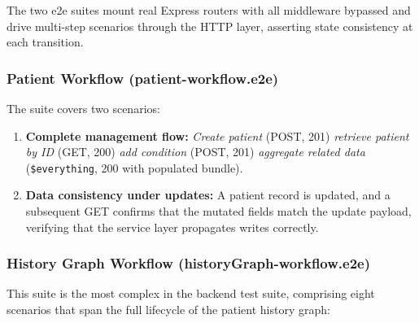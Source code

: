 The two e2e suites mount real Express routers with all middleware bypassed and
drive multi-step scenarios through the HTTP layer, asserting state consistency
at each transition.

\subsubsection{Patient Workflow (patient-workflow.e2e)}

The suite covers two scenarios:

\begin{enumerate}
  \item \textbf{Complete management flow:} \textit{Create patient}
        (POST, 201) \textrightarrow{} \textit{retrieve patient by ID}
        (GET, 200) \textrightarrow{} \textit{add condition}
        (POST, 201) \textrightarrow{} \textit{aggregate related data}
        (\texttt{\$everything}, 200 with populated bundle).
  \item \textbf{Data consistency under updates:} A patient record is updated,
        and a subsequent GET confirms that the mutated fields match the update
        payload, verifying that the service layer propagates writes correctly.
\end{enumerate}

\subsubsection{History Graph Workflow (historyGraph-workflow.e2e)}

This suite is the most complex in the backend test suite, comprising eight
scenarios that span the full lifecycle of the patient history graph:

